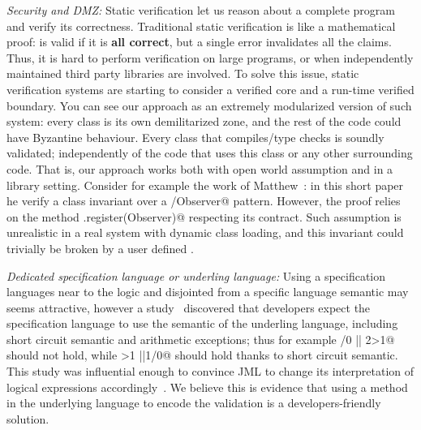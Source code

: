 \noindent\textit{Security and DMZ:}
Static verification let us reason about a complete program
and verify its correctness.
Traditional static verification is like a mathematical proof: is valid if it is \textbf{all correct},
but a single error invalidates all the claims.
Thus, it is hard to perform verification on large programs, or when independently
maintained third party libraries are involved.
To solve this issue, static verification systems are starting to consider a verified core
and a run-time verified boundary.
You can see our approach as an extremely modularized version of such system:
every class is its own demilitarized zone, and the rest of the code 
could have Byzantine behaviour.
Every class that compiles/type checks is soundly validated;
independently of the code that uses this class or any other surrounding code.
That is, our approach works both with open world assumption and in a library setting.
Consider for example the work of Matthew~\cite{parkinson2007class}:
in this short paper he verify a \Q@Observer@ class invariant over
a \Q@Subject/Observer@ pattern.
However, the proof relies on the method \Q@Subject.register(Observer)@ respecting its contract.
Such assumption is unrealistic in a real system with dynamic class loading,
and this invariant could trivially be broken by a user defined \Q@EvilSubject@.


\noindent\textit{Dedicated specification language or underling language:}
Using a specification languages near to the logic and disjointed from a specific language
semantic may seems attractive, however
a study~\cite{chalin2007logical} discovered that developers expect
the specification language to use the semantic of the underling language, including
short circuit semantic and arithmetic exceptions; thus for example
/0 || 2>1@
should not hold, while 
>1 ||1/0@ should hold thanks to short circuit semantic.
This study was influential enough to convince JML to change its interpretation of logical expressions
accordingly~\cite{chalin2008jml}.
We believe this is evidence that using a method in the underlying language to encode the validation is
a developers-friendly solution.









